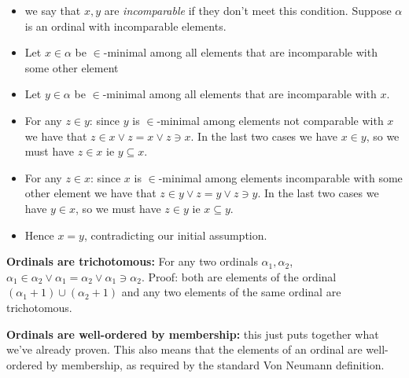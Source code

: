 \documentclass{article}
\begin{document}
\begin{itemize}
\item we say that $x, y$ are \emph{incomparable} if they don't meet this condition. Suppose $\alpha$ is an ordinal with incomparable elements.
\item Let $x \in \alpha$ be $\in$-minimal among all elements that are incomparable with some other element
\item Let $y \in \alpha$ be $\in$-minimal among all elements that are incomparable with $x$.
\item For any $z \in y$: since $y$ is $\in$-minimal among elements not comparable with $x$ we have that $z \in x \vee z = x \vee z \ni x$. In the last two cases we have $x \in y$, so we must have $z \in x$ ie $y \subseteq x$.
\item For any $z \in x$: since $x$ is $\in$-minimal among elements incomparable with some other element we have that $z \in y \vee z = y \vee z \ni y$. In the last two cases we have $y \in x$, so we must have $z \in y$ ie $x \subseteq y$.
\item Hence $x = y$, contradicting our initial assumption.
\end{itemize}

\textbf{Ordinals are trichotomous:} For any two ordinals $\alpha_1, \alpha_2$, $\alpha_1 \in \alpha_2 \vee \alpha_1 = \alpha_2 \vee \alpha_1 \ni \alpha_2$. Proof: both are elements of the ordinal $(\alpha_1 + 1) \cup (\alpha_2 + 1)$ and any two elements of the same ordinal are trichotomous.

\textbf{Ordinals are well-ordered by membership:} this just puts together what we've already proven. This also means that the elements of an ordinal are well-ordered by membership, as required by the standard Von Neumann definition.

{}

\end{document}
